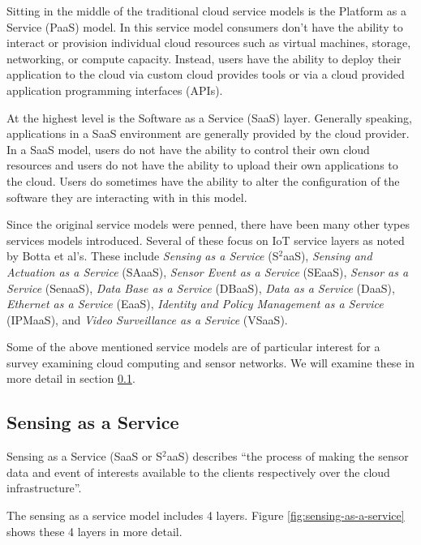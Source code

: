 \documentclass[]{article}
\begin{document}
Sitting in the middle of the traditional cloud service models is the Platform as a Service (PaaS)  model. In this service model consumers don't have the ability to interact or provision individual cloud resources such as virtual machines, storage, networking, or compute capacity. Instead, users have the ability to deploy their application to the cloud via custom cloud provides tools or via a cloud provided application programming interfaces (APIs).

At the highest level is the Software as a Service (SaaS) layer. Generally speaking, applications in a SaaS environment are generally provided by the cloud provider. In a SaaS model, users do not have the ability to control their own cloud resources and users do not have the ability to upload their own applications to the cloud. Users do sometimes have the ability to alter the configuration of the software they are interacting with in this model.

Since the original service models were penned, there have been many other types services models introduced. Several of these focus on IoT service layers as noted by Botta et al's\cite{botta_integration_2016}. These include \textit{Sensing as a Service} (S$^2$aaS), \textit{Sensing and Actuation as a Service} (SAaaS), \textit{Sensor Event as a Service} (SEaaS), \textit{Sensor as a Service} (SenaaS), \textit{Data Base as a Service} (DBaaS), \textit{Data as a Service} (DaaS), \textit{Ethernet as a Service} (EaaS), \textit{Identity and Policy Management as a Service} (IPMaaS), and \textit{Video Surveillance as a Service} (VSaaS).

Some of the above mentioned service models are of particular interest for a survey examining cloud computing and sensor networks. We will examine these in more detail in section \ref{ssec:sensing-as-a-service}.

\subsection{Sensing as a Service} \label{ssec:sensing-as-a-service}
Sensing as a Service (SaaS or S$^2$aaS) describes ``the process of making the sensor data and event of interests available to the clients respectively over the cloud infrastructure''\cite{dash_survey_2010}. 

The sensing as a service model includes 4 layers\cite{perera_sensing_2014}. Figure \ref{fig:sensing-as-a-service} shows these 4 layers in more detail.
\end{document}
